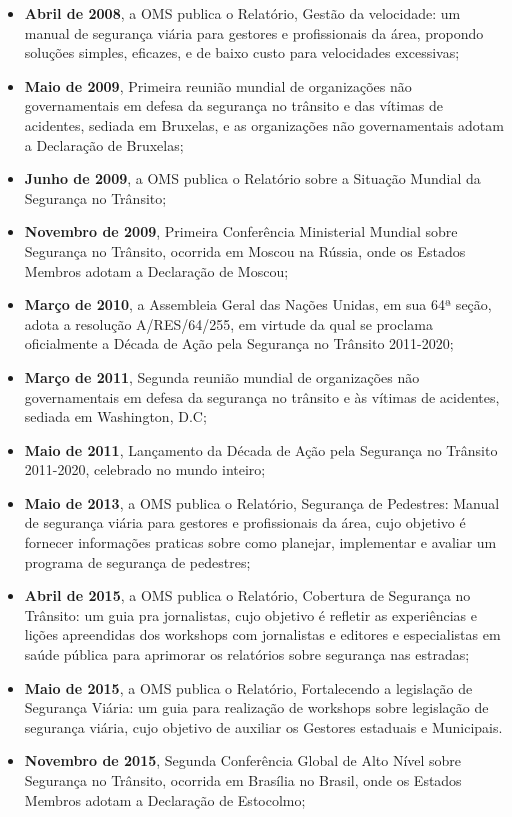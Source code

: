 \documentclass[output=paper,colorlinks,citecolor=green]{langscibook}
\begin{document}
\begin{itemize}
\item \textbf{Abril de 2008}, a OMS publica o Relatório, Gestão da velocidade: um manual de segurança viária para gestores e profissionais da área, propondo soluções simples, eficazes, e de baixo custo para velocidades excessivas;
\item \textbf{Maio de 2009}, Primeira reunião mundial de organizações não governamentais em defesa da segurança no trânsito e das vítimas de acidentes, sediada em Bruxelas, e as organizações não governamentais adotam a Declaração de Bruxelas;
\item \textbf{Junho de 2009}, a OMS publica o Relatório sobre a Situação Mundial da Segurança no Trânsito;
\item \textbf{Novembro de 2009}, Primeira Conferência Ministerial Mundial sobre Segurança no Trânsito, ocorrida em Moscou na Rússia, onde os Estados Membros adotam a Declaração de Moscou;
\item \textbf{Março de 2010}, a Assembleia Geral das Nações Unidas, em sua 64ª seção, adota a resolução A/RES/64/255, em virtude da qual se proclama oﬁcialmente a Década de Ação pela Segurança no Trânsito 2011-2020;
\item \textbf{Março de 2011}, Segunda reunião mundial de organizações não governamentais em defesa da segurança no trânsito e às vítimas de acidentes, sediada em Washington, D.C;
\item \textbf{Maio de 2011}, Lançamento da Década de Ação pela Segurança no Trânsito 2011-2020, celebrado no mundo inteiro;
\item \textbf{Maio de 2013}, a OMS publica o Relatório, Segurança de Pedestres: Manual de segurança viária para gestores e profissionais da área, cujo objetivo é fornecer informações praticas sobre como planejar, implementar e avaliar um programa de segurança de pedestres;
\item \textbf{Abril de 2015}, a OMS publica o Relatório, Cobertura de Segurança no Trânsito: um guia pra jornalistas, cujo objetivo é refletir as experiências e lições apreendidas dos workshops com jornalistas e editores e especialistas em saúde pública para aprimorar os relatórios sobre segurança nas estradas;
\item \textbf{Maio de 2015}, a OMS publica o Relatório, Fortalecendo a legislação de Segurança Viária: um guia para realização de workshops sobre legislação de segurança viária, cujo objetivo de auxiliar os Gestores estaduais e Municipais.
\item \textbf{Novembro de 2015}, Segunda Conferência Global de Alto Nível sobre Segurança no Trânsito, ocorrida em Brasília no Brasil, onde os Estados Membros adotam a Declaração de Estocolmo;

\end{itemize}
\end{document}
